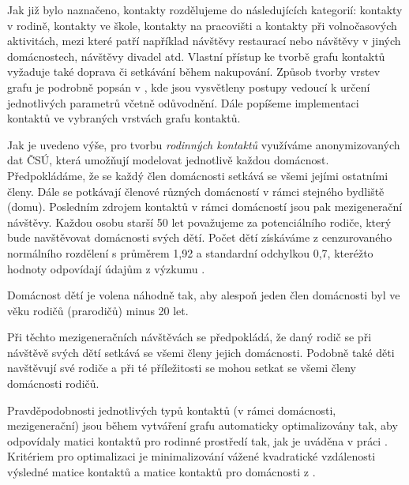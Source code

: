 Jak již bylo naznačeno, kontakty rozdělujeme do následujících kategorií: kontakty v rodině, kontakty ve škole, kontakty na pracovišti a kontakty při volnočasových aktivitách, mezi které patří například návštěvy restaurací nebo návštěvy v jiných domácnostech, návštěvy divadel atd. Vlastní přístup ke tvorbě grafu kontaktů vyžaduje také doprava či setkávání během nakupování. Způsob tvorby vrstev grafu je podrobně popsán v \cite{pg:modelM}, kde jsou vysvětleny postupy vedoucí k určení jednotlivých parametrů včetně odůvodnění. Dále popíšeme implementaci kontaktů ve vybraných vrstvách grafu kontaktů.

Jak je uvedeno výše, pro tvorbu \emph{rodinných kontaktů} využíváme anonymizovaných dat ČSÚ, která umožňují modelovat jednotlivě každou domácnost. Předpokládáme, že se každý člen domácnosti setkává se všemi jejími ostatními členy. Dále se potkávají členové různých domácností v rámci stejného bydliště (domu). Posledním zdrojem kontaktů v rámci domácností jsou pak mezigenerační návštěvy.
Každou osobu starší 50 let považujeme za potenciálního rodiče, který bude navštěvovat domácnosti svých dětí. Počet dětí získáváme z cenzurovaného normálního rozdělení s průměrem 1,92 a standardní odchylkou 0,7, kteréžto hodnoty odpovídají údajům z výzkumu \cite{zaj:ess}.

Domácnost dětí je volena náhodně tak, aby alespoň jeden člen domácnosti byl ve věku rodičů (prarodičů) minus 20 let.

Při těchto mezigeneračních návštěvách se předpokládá, že daný rodič se při návštěvě svých dětí setkává se všemi členy jejich domácnosti. Podobně také děti navštěvují své rodiče a při té příležitosti se mohou setkat se všemi členy domácnosti rodičů.

Pravděpodobnosti jednotlivých typů kontaktů (v rámci domácnosti, mezigenerační) jsou během vytváření grafu automaticky optimalizovány tak, aby odpovídaly matici kontaktů pro rodinné prostředí tak, jak je uváděna v práci \cite{Prem_etal2017}. Kritériem pro optimalizaci je 
minimalizování vážené kvadratické vzdálenosti výsledné matice kontaktů a matice kontaktů pro domácnosti z \cite{Prem_etal2017}.


